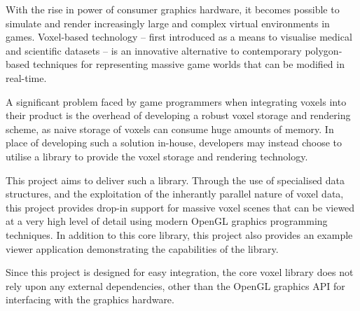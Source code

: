With the rise in power of consumer graphics hardware, it becomes possible to
simulate and render increasingly large and complex virtual environments in games.
Voxel-based technology -- first introduced as a means to visualise medical and 
scientific datasets -- is an innovative alternative to contemporary 
polygon-based techniques for representing massive game worlds that can be 
modified in real-time.

A significant problem faced by game programmers when integrating voxels into
their product is the overhead of developing a robust voxel storage and rendering
scheme, as naive storage of voxels can consume huge amounts of memory. In place of 
developing such a solution in-house, developers may instead choose to utilise a 
library to provide the voxel storage and rendering technology.

This project aims to deliver such a library. Through the use of specialised data 
structures, and the exploitation of the inherantly parallel nature of voxel data,
this project provides drop-in support for massive voxel scenes that can be viewed
at a very high level of detail using modern OpenGL graphics programming techniques. 
In addition to this core library, this project also provides an example viewer application
demonstrating the capabilities of the library.

Since this project is designed for easy integration, the core voxel library does
not rely upon any external dependencies, other than the OpenGL graphics API for
interfacing with the graphics hardware. 
